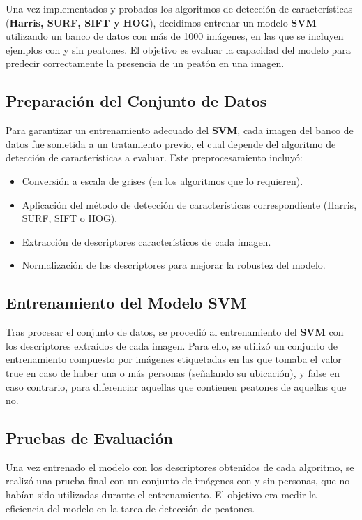 \documentclass[a4paper]{article}
\begin{document}
Una vez implementados y probados los algoritmos de detección de características (\textbf{Harris, SURF, SIFT y HOG}), decidimos entrenar un modelo \textbf{SVM} utilizando un banco de datos con más de 1000 imágenes, en las que se incluyen ejemplos con y sin peatones. El objetivo es evaluar la capacidad del modelo para predecir correctamente la presencia de un peatón en una imagen.

\subsection{Preparación del Conjunto de Datos}

Para garantizar un entrenamiento adecuado del \textbf{SVM}, cada imagen del banco de datos fue sometida a un tratamiento previo, el cual depende del algoritmo de detección de características a evaluar. Este preprocesamiento incluyó:
\begin{itemize}
    \item Conversión a escala de grises (en los algoritmos que lo requieren).
    \item Aplicación del método de detección de características correspondiente (Harris, SURF, SIFT o HOG).
    \item Extracción de descriptores característicos de cada imagen.
    \item Normalización de los descriptores para mejorar la robustez del modelo.
\end{itemize}

\subsection{Entrenamiento del Modelo SVM}

Tras procesar el conjunto de datos, se procedió al entrenamiento del \textbf{SVM} con los descriptores extraídos de cada imagen. Para ello, se utilizó un conjunto de entrenamiento compuesto por imágenes etiquetadas en las que tomaba 
el valor true en caso de haber una o más personas (señalando su ubicación), y false en caso contrario, para diferenciar aquellas que contienen peatones de aquellas que no.


\subsection{Pruebas de Evaluación}

Una vez entrenado el modelo con los descriptores obtenidos de cada algoritmo, se realizó una prueba final con un conjunto de imágenes con y sin personas, que no habían sido utilizadas durante el entrenamiento. El objetivo era medir la eficiencia del modelo en la tarea de detección de peatones.
\end{document}
